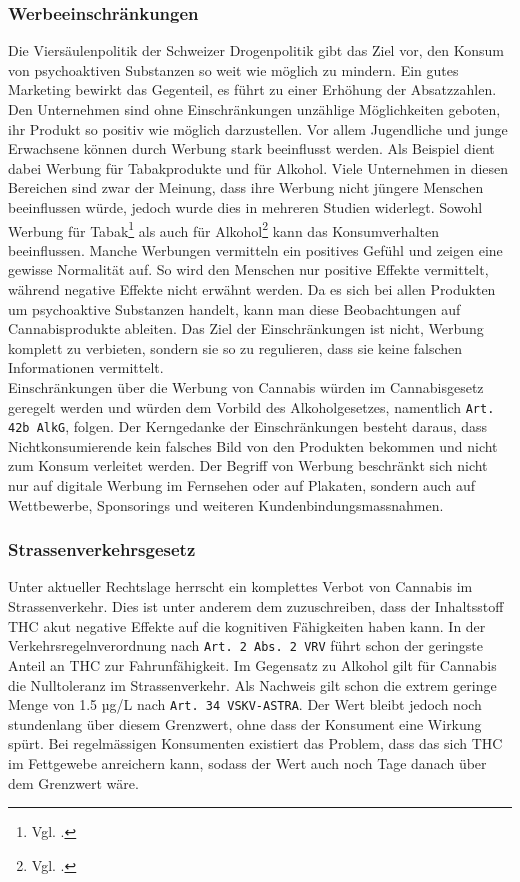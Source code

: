 \documentclass[../main.tex]{subfiles}
\begin{document}
	 \subsubsection{Werbeeinschränkungen}
	 Die Viersäulenpolitik der Schweizer Drogenpolitik gibt das Ziel vor, den Konsum von psychoaktiven Substanzen so weit wie möglich zu mindern.
	 Ein gutes Marketing bewirkt das Gegenteil, es führt zu einer Erhöhung der Absatzzahlen.
	 Den Unternehmen sind ohne Einschränkungen unzählige Möglichkeiten geboten, ihr Produkt so positiv wie möglich darzustellen.	 
	 Vor allem Jugendliche und junge Erwachsene können durch Werbung stark beeinflusst werden.
	 Als Beispiel dient dabei Werbung für Tabakprodukte und für Alkohol.
	 Viele Unternehmen in diesen Bereichen sind zwar der Meinung, dass ihre Werbung nicht jüngere Menschen beeinflussen würde, jedoch wurde dies in mehreren Studien widerlegt.
	 Sowohl Werbung für Tabak\footnote{Vgl. \cite{lovato}.} als auch für Alkohol\footnote{Vgl. \cite{jernigan}.} kann das Konsumverhalten beeinflussen.
	 Manche Werbungen vermitteln ein positives Gefühl und zeigen eine gewisse Normalität auf. 
	 So wird den Menschen nur positive Effekte vermittelt, während negative Effekte nicht erwähnt werden.
	 Da es sich bei allen Produkten um psychoaktive Substanzen handelt, kann man diese Beobachtungen auf Cannabisprodukte ableiten.
	 Das Ziel der Einschränkungen ist nicht, Werbung komplett zu verbieten, sondern sie so zu regulieren, dass sie keine falschen Informationen vermittelt.\\
	 
	 \noindent	 
	 Einschränkungen über die Werbung von Cannabis würden im Cannabisgesetz geregelt werden und würden dem Vorbild des Alkoholgesetzes, namentlich \texttt{Art. 42b AlkG}, folgen.
	 Der Kerngedanke der Einschränkungen besteht daraus, dass Nichtkonsumierende kein falsches Bild von den Produkten bekommen und nicht zum Konsum verleitet werden.
	 Der Begriff von Werbung beschränkt sich nicht nur auf digitale Werbung im Fernsehen oder auf Plakaten, sondern auch auf Wettbewerbe, Sponsorings und weiteren Kundenbindungsmassnahmen.
	 
	 	 
	 \subsubsection{Strassenverkehrsgesetz}
	 Unter aktueller Rechtslage herrscht ein komplettes Verbot von Cannabis im Strassenverkehr. 
	 Dies ist unter anderem dem zuzuschreiben, dass der Inhaltsstoff THC akut negative Effekte auf die kognitiven Fähigkeiten haben kann.	 
	 In der Verkehrsregelnverordnung nach \texttt{Art. 2 Abs. 2 VRV} führt schon der geringste Anteil an THC zur Fahrunfähigkeit.
	 Im Gegensatz zu Alkohol gilt für Cannabis die Nulltoleranz im Strassenverkehr.
	 Als Nachweis gilt schon die extrem geringe Menge von 1.5 µg/L nach \texttt{Art. 34 VSKV-ASTRA}.
	 Der Wert bleibt jedoch noch stundenlang über diesem Grenzwert, ohne dass der Konsument eine Wirkung spürt.
	 Bei regelmässigen Konsumenten existiert das Problem, dass das sich THC im Fettgewebe anreichern kann, sodass der Wert auch noch Tage danach über dem Grenzwert wäre. \\
	 
\end{document}
